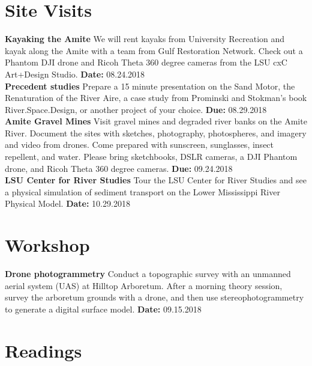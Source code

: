 \documentclass[11pt,article,oneside]{memoir}
\begin{document}
\section{Site Visits}

\noindent \textbf{Kayaking the Amite}
We will rent kayaks from University Recreation
and kayak along the Amite 
with a team from Gulf Restoration Network. 
Check out a Phantom DJI drone
and Ricoh Theta 360 degree cameras from the
LSU cxC Art+Design Studio. 
\textbf{Date:} 08.24.2018 \\

\noindent \textbf{Precedent studies}
Prepare a 15 minute presentation on 
the Sand Motor, 
the Renaturation of the River Aire, 
a case study from Prominski and Stokman's book River.Space.Design,
or another project of your choice. 
\textbf{Due:} 08.29.2018 \\

\noindent \textbf{Amite Gravel Mines}
Visit gravel mines and degraded river banks on the Amite River.
Document the sites with sketches, photography, photospheres, and
imagery and video from drones.
Come prepared with sunscreen, sunglasses, insect repellent, and water.
Please bring sketchbooks, DSLR cameras,
a DJI Phantom drone, and Ricoh Theta 360 degree cameras.
\textbf{Due:} 09.24.2018 \\

\noindent \textbf{LSU Center for River Studies}
Tour the LSU Center for River Studies
and see a physical simulation of sediment transport on
the Lower Mississippi River Physical Model.
\textbf{Date:} 10.29.2018\\

\section{Workshop}
\noindent \textbf{Drone photogrammetry}
Conduct a topographic survey with an unmanned aerial system (UAS)
at Hilltop Arboretum. 
After a morning theory session, 
survey the arboretum grounds with a drone,
and then use stereophotogrammetry to generate a digital surface model.
\textbf{Date:} 09.15.2018 \\


\clearpage

\section{Readings}
\renewcommand*{\bibfont}{\normalsize} %
\vspace*{0.5cm}
\nocite{*}
\setlength{}
\printbibliography[heading=none]
\end{document}
